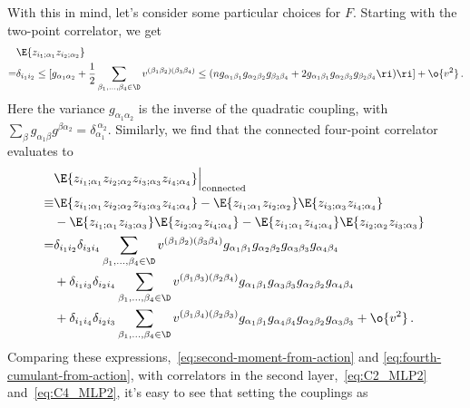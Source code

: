 With this in mind, let's consider some particular choices for $F$. 
Starting with the two-point correlator, we get
\begin{align}\label{eq:second-moment-from-action}
&\E{z_{i_1;\alpha_1} z_{i_2;\alpha_2}}\, \\%
=&\delta_{i_1 i_2}\le[g_{\alpha_1\alpha_2}+\frac{1}{2}\sum_{\beta_1,\ldots,\beta_4\in\D}v^{(\beta_1\beta_2)(\beta_3\beta_4)}\le(n g_{\alpha_1\beta_1}g_{\alpha_2\beta_2}g_{\beta_3\beta_4}+2g_{\alpha_1\beta_1}g_{\alpha_2\beta_3}g_{\beta_2\beta_4}\ri)\ri]+\o{v^2}\, .\nonumber
\end{align}
Here the variance $g_{\alpha_1\alpha_2}$ is the inverse of the quadratic coupling, with $\sum_{\beta }g_{\alpha_1\beta}g^{\beta\alpha_2}=\delta_{\alpha_1}^{\ \alpha_2}$.
Similarly, we find that the connected four-point correlator evaluates to
\begin{align}\label{eq:fourth-cumulant-from-action}
&\E{z_{i_1;\alpha_1} z_{i_2;\alpha_2}z_{i_3;\alpha_3} z_{i_4;\alpha_4}}\Big\vert_{\text{connected}}\, \\
\equiv&\E{z_{i_1;\alpha_1} z_{i_2;\alpha_2}z_{i_3;\alpha_3} z_{i_4;\alpha_4}}-\E{z_{i_1;\alpha_1} z_{i_2;\alpha_2}}\E{z_{i_3;\alpha_3} z_{i_4;\alpha_4}}\, \nonumber\\
&-\E{z_{i_1;\alpha_1} z_{i_3;\alpha_3}}\E{z_{i_2;\alpha_2} z_{i_4;\alpha_4}}-\E{z_{i_1;\alpha_1} z_{i_4;\alpha_4}}\E{z_{i_2;\alpha_2} z_{i_3;\alpha_3}}\,  \nonumber\\
=&\delta_{i_1 i_2}\delta_{i_3 i_4}\sum_{\beta_1,\ldots,\beta_4\in\D}v^{(\beta_1\beta_2)(\beta_3\beta_4)}g_{\alpha_1\beta_1}g_{\alpha_2\beta_2}g_{\alpha_3\beta_3}g_{\alpha_4\beta_4}\, \nonumber\\
&+\delta_{i_1 i_3}\delta_{i_2 i_4}\sum_{\beta_1,\ldots,\beta_4\in\D}v^{(\beta_1\beta_3)(\beta_2\beta_4)}g_{\alpha_1\beta_1}g_{\alpha_3\beta_3}g_{\alpha_2\beta_2}g_{\alpha_4\beta_4}\, \nonumber\\
&+\delta_{i_1 i_4}\delta_{i_2 i_3}\sum_{\beta_1,\ldots,\beta_4\in\D}v^{(\beta_1\beta_4)(\beta_2\beta_3)}g_{\alpha_1\beta_1}g_{\alpha_4\beta_4}g_{\alpha_2\beta_2}g_{\alpha_3\beta_3}+\o{v^2}\, .\nonumber
\end{align}
Comparing these expressions,~\eqref{eq:second-moment-from-action} and \eqref{eq:fourth-cumulant-from-action}, with correlators in the second layer,~\eqref{eq:C2_MLP2} and~\eqref{eq:C4_MLP2}, it's easy to see that setting the couplings as
